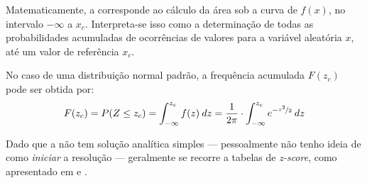 Matematicamente, a  corresponde ao cálculo
da área sob a curva de $f(x)$, no intervalo $-\infty$ a $x_c$. Interpreta-se
isso como a determinação de todas as probabilidades acumuladas de ocorrências
de valores para a variável aleatória $x$, até um valor de referência $x_c$.

No caso de uma distribuição normal padrão, a frequência acumulada $F(z_c)$ pode
ser obtida por:
\begin{equation}
    F(z_c) = P(Z \leq z_c) = \int_{{-\infty}}^{{z_c}} {f(z)} \: d{z} {} =
    \frac{1}{2 \pi} \cdot \int_{{-\infty}}^{{z_c}} {e^{-\nicefrac{z^2}{2}}} \: d{z} {}
    \label{eq:freq-acumulada-dist-padrao}
\end{equation}

Dado que a  não tem solução analítica
simples --- pessoalmente não tenho ideia de como \emph{iniciar} a resolução ---
geralmente se recorre a tabelas de \emph{z-score}, como apresentado em
\parencite[p.~331]{favero} e \parencite[p.~2008--2009]{favero}.
